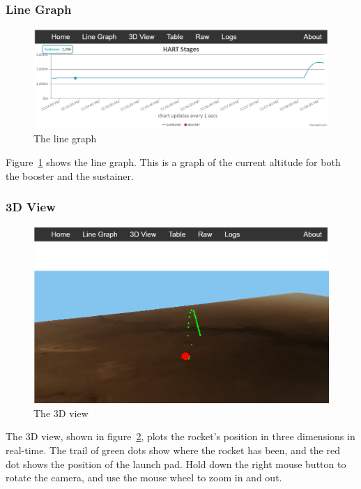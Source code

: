 \documentclass[10pt,draftclsnofoot,onecolumn]{IEEEtran}
\begin{document}
\subsubsection{Line Graph}
	\begin{figure}[thbp!]
		\centering\includegraphics[width=170mm]{gs-line}
		\caption{The line graph}
		\label{gs-line}
	\end{figure}
	
Figure~\ref{gs-line} shows the line graph.
This is a graph of the current altitude for both the booster and the sustainer.

\subsubsection{3D View}
	\begin{figure}[thbp!]
		\centering\includegraphics[width=170mm]{gs-3d}
		\caption{The 3D view}
		\label{gs-3d}
	\end{figure}
The 3D view, shown in figure~\ref{gs-3d}, plots the rocket's position in three dimensions in real-time.
The trail of green dots show where the rocket has been, and the red dot shows the position of the launch pad.
Hold down the right mouse button to rotate the camera, and use the mouse wheel to zoom in and out.
\end{document}
